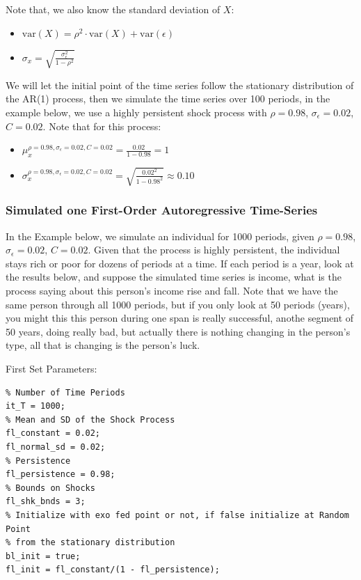 \documentclass[
]{book}
\begin{document}
Note that, we also know the standard deviation of \(X\):

\begin{itemize}
\item
  \(\displaystyle \textrm{var}\left(X\right)=\rho^2 \cdot \textrm{var}\left(X\right)+\textrm{var}\left(\epsilon \right)\)
\item
  \(\displaystyle \sigma_x =\sqrt{\frac{\sigma_{\epsilon }^2 }{1-\rho^2 }}\)
\end{itemize}

We will let the initial point of the time series follow the stationary
distribution of the AR(1) process, then we simulate the time series over
100 periods, in the example below, we use a highly persistent shock
process with \(\rho =0.98\), \(\sigma_{\epsilon } =0.02\), \(C=0.02\). Note
that for this process:

\begin{itemize}
\item
  \(\displaystyle \mu_x^{\rho =0.98,\sigma_{\epsilon } =0.02,C=0.02} =\frac{0.02}{1-0.98}=1\)
\item
  \(\displaystyle \sigma_x^{\rho =0.98,\sigma_{\epsilon } =0.02,C=0.02} =\sqrt{\frac{0.02^2 }{1-0.98^2 }}\approx 0.10\)
\end{itemize}

\hypertarget{simulated-one-first-order-autoregressive-time-series}{%
\subsubsection{Simulated one First-Order Autoregressive Time-Series}\label{simulated-one-first-order-autoregressive-time-series}}

In the Example below, we simulate an individual for 1000 periods, given
\(\rho =0.98\), \(\sigma_{\epsilon } =0.02\), \(C=0.02\). Given that the
process is highly persistent, the individual stays rich or poor for
dozens of periods at a time. If each period is a year, look at the
results below, and suppose the simulated time series is income, what is
the process saying about this person's income rise and fall. Note that
we have the same person through all 1000 periods, but if you only look
at 50 periods (years), you might this this person during one span is
really successful, anothe segment of 50 years, doing really bad, but
actually there is nothing changing in the person's type, all that is
changing is the person's luck.

First Set Parameters:

\begin{verbatim}
% Number of Time Periods
it_T = 1000;
% Mean and SD of the Shock Process
fl_constant = 0.02;
fl_normal_sd = 0.02;
% Persistence
fl_persistence = 0.98;
% Bounds on Shocks
fl_shk_bnds = 3;
% Initialize with exo fed point or not, if false initialize at Random Point
% from the stationary distribution
bl_init = true;
fl_init = fl_constant/(1 - fl_persistence);
\end{verbatim}
\end{document}
